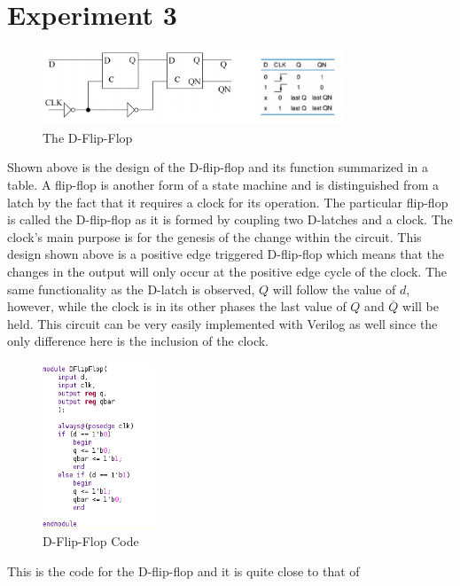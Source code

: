 \documentclass[12pt]{article}
\begin{document}
    \section*{Experiment 3}
    \begin{figure}[h]
        \centering
        \includegraphics[width=0.8\textwidth]{DFlipFlop.png}
        \caption{The D-Flip-Flop}
    \end{figure}
    \par Shown above is the design of the D-flip-flop and its function
    summarized in a table. A flip-flop is another form of a state machine and is
    distinguished from a latch by the fact that it requires a clock for its
    operation. The particular flip-flop is called the D-flip-flop as it is
    formed by coupling two D-latches and a clock. The clock's main purpose is
    for the genesis of the change within the circuit. This design shown above is
    a positive edge triggered D-flip-flop which means that the changes in the
    output will only occur at the positive edge cycle of the clock. The same
    functionality as the D-latch is observed, $Q$ will follow the value of $d$,
    however, while the clock is in its other phases the last value of $Q$ and
    $\overline{Q}$ will be held. This circuit can be very easily implemented
    with Verilog as well since the only difference here is the inclusion of the
    clock.
    \begin{figure}[h]
        \centering
        \includegraphics[width=0.3\textwidth]{DFlipFlop Code.png}
        \caption{D-Flip-Flop Code}
    \end{figure}
    \par This is the code for the D-flip-flop and it is quite close to that of
\end{document}
